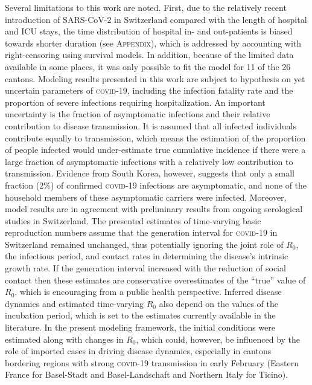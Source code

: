   Several limitations to this work are noted. First, due to the relatively recent introduction of SARS-CoV-2 in Switzerland compared with the length of hospital and ICU stays, the time distribution of hospital in- and out-patients is biased towards shorter duration (see \textsc{Appendix}), which is addressed by accounting with right-censoring using survival models. In addition, because of the limited data available in some places, it was only possible to fit the model for 11 of the 26 cantons. Modeling results presented in this work are subject to hypothesis on yet uncertain parameters of \textsc{covid}-19, including the infection fatality rate and the proportion of severe infections requiring hospitalization. An important uncertainty is the fraction of asymptomatic infections and their relative contribution to disease transmission. It is assumed that all infected individuals contribute equally to transmission, which means the estimation of the proportion of people infected would under-estimate true cumulative incidence if there were a large fraction of asymptomatic infections with a relatively low contribution to transmission. Evidence from South Korea, however, suggests that only a small fraction (2\%) of confirmed \textsc{covid}-19 infections are asymptomatic, and none of the household members of these asymptomatic carriers were infected\cite[-4\baselineskip]{Park:EarlyReleaseCoronavirus:2020}. Moreover, model results are in agreement with preliminary results from ongoing serological studies in Switzerland\cite[-2\baselineskip]{Stringhini:RepeatedSeroprevalenceAntiSARSCoV2:2020}.  The presented estimates of time-varying basic reproduction numbers assume that the generation interval for \textsc{covid}-19 in Switzerland remained unchanged, thus potentially ignoring the joint role of $R_0$, the infectious period, and contact rates in determining the disease’s intrinsic growth rate\cite{Yan:SeparateRolesLatent:2008}. If the generation interval increased with the reduction of social contact then these estimates are conservative overestimates of the “true” value of $R_0$, which is encouraging from a public health perspective. Inferred disease dynamics and estimated time-varying $R_0$ also depend on the values of the incubation period, which is set to the estimates currently available in the literature. 
  In the present modeling framework, the initial conditions were estimated along with changes in $R_0$, which could, however, be influenced by the role of imported cases in driving disease dynamics, especially in cantons bordering regions with strong \textsc{covid}-19 transmission in early February (Eastern France for Basel-Stadt and Basel-Landschaft and Northern Italy for Ticino). 

